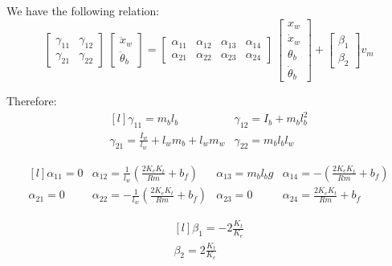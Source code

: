 \documentclass[11pt]{article}
\begin{document}
We have the following relation:
\begin{equation*}
	\begin{bmatrix}
	\gamma_{11} & \gamma_{12}\\
	\gamma_{21} & \gamma_{22}
	\end{bmatrix}
\
	\begin{bmatrix}
	\ddot x_w\\
	\ddot \theta_b
	\end{bmatrix}
=
	\begin{bmatrix}
	\alpha_{11} & \alpha_{12} & \alpha_{13} & \alpha_{14}\\
	\alpha_{21} & \alpha_{22} & \alpha_{23} & \alpha_{24}
	\end{bmatrix}
\
	\begin{bmatrix}
	x_w\\
	\dot x_w\\
	\theta_b\\
	\dot \theta_b
	\end{bmatrix}
+
	\begin{bmatrix}
	\beta_{1}\\
	\beta_{2}
	\end{bmatrix}
v_m
\end{equation*}

Therefore:
\begin{equation*}
\begin{matrix*}[l]
\gamma_{11}=m_bl_b & \gamma_{12}=I_b+m_bl_b^2 \\
\gamma_{21}=\frac{I_w}{l_w}+l_wm_b+l_wm_w & \gamma_{22}=m_bl_bl_w
\end{matrix*}
\end{equation*}

\begin{equation*}
\begin{matrix*}[l]
\alpha_{11}=0 & \alpha_{12}=\frac{1}{l_w}(\frac{2K_eK_t}{Rm}+b_f) & \alpha_{13}=m_bl_bg & \alpha_{14}=-(\frac{2K_eK_t}{Rm}+b_f) \\
\alpha_{21}=0 & \alpha_{22}=-\frac{1}{l_w}(\frac{2K_eK_t}{Rm}+b_f) & \alpha_{23}=0 & \alpha_{24}=\frac{2K_eK_t}{Rm}+b_f
\end{matrix*}
\end{equation*}

\begin{equation*}
\begin{matrix*}[l]
\beta_{1}=-2\frac{K_t}{K_e} \\
\beta_{2}=2\frac{K_t}{K_e}
\end{matrix*}
\end{equation*}
\end{document}
